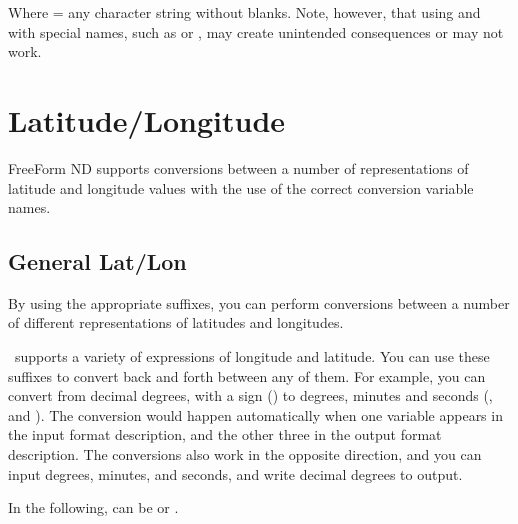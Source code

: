 Where  = any character string without blanks.  Note,
however, that using  and  with special names, such
as  or , may create unintended consequences or
may not work.

\section{Latitude/Longitude}

FreeForm ND supports conversions between a number of representations
of latitude and longitude values with the use of the correct
conversion variable names.

\subsection{General Lat/Lon}

By using the appropriate suffixes, you can perform conversions between
a number of different representations of latitudes and longitudes.

\ffnd\ supports a variety of expressions of longitude and latitude.
You can use these suffixes to convert back and forth between any of
them.  For example, you can convert from decimal degrees, with a sign
() to degrees, minutes and seconds (,
 and ).  The
conversion would happen automatically when one variable appears in the
input format description, and the other three in the output format
description.  The conversions also work in the opposite direction, and
you can input degrees, minutes, and seconds, and write decimal degrees
to output.

In the following,  can be  or .

